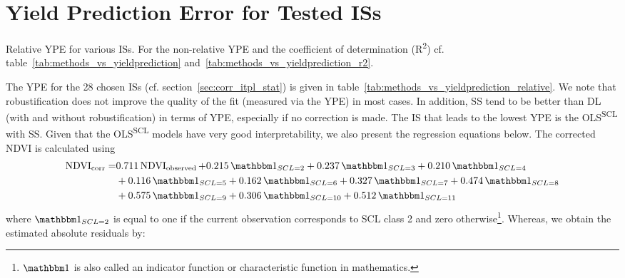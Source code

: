 \section{Yield Prediction Error for Tested ISs} \label{sec:results_ndvi_corr}
	\begin{table}
		\begin{center}
			\caption[Relative Yield Estimation Error for ISs]{Relative YPE for various ISs. For the non-relative YPE and the coefficient of determination (R\textsuperscript{2}) cf. table~\ref{tab:methods_vs_yieldprediction} and~\ref{tab:methods_vs_yieldprediction_r2}.}
			\small
			
			\label{tab:methods_vs_yieldprediction_relative}
			\normalsize
		\end{center}
	\end{table}
	The YPE for the 28 chosen {{IS}}s (cf. section~\ref{sec:corr_itpl_stat}) is given in table~\ref{tab:methods_vs_yieldprediction_relative}. We note that robustification does not improve the quality of the fit (measured via the YPE) in most cases. 
	In addition, SS tend to be better than DL (with and without robustification) in terms of YPE, especially if no correction is made. The {{IS}} that leads to the lowest YPE is the OLS\textsuperscript{SCL} with SS. Given that the OLS\textsuperscript{SCL} models have very good interpretability, we also present the regression equations below. The corrected NDVI is calculated using 
	\begin{equation}\label{eq:corr_lm}
		\begin{aligned}		
			{\operatorname{NDVI}}_{\text{corr}}  = &
			0.711 \operatorname{NDVI}_\text{observed}  
			+ 0.215 \,\mathbbm 1_{{SCL = 2}} 
			+ 0.237 \,\mathbbm 1_{{SCL = 3}} 
			+ 0.210 \,\mathbbm 1_{{SCL = 4}} \\ &
			+ 0.116 \,\mathbbm 1_{{SCL = 5}} 
			+ 0.162 \,\mathbbm 1_{{SCL = 6}} 
			+ 0.327 \,\mathbbm 1_{{SCL = 7}} 
			+ 0.474 \,\mathbbm 1_{{SCL = 8}} \\ &
			+ 0.575 \,\mathbbm 1_{{SCL = 9}} 
			+ 0.306 \,\mathbbm 1_{{SCL = 10}} 
			+ 0.512 \,\mathbbm 1_{{SCL = 11}} 
		\end{aligned}
	\end{equation} 
	where $\mathbbm 1_{{SCL = 2}}$ is equal to one if the current observation corresponds to SCL class 2 and zero otherwise\footnote{$\mathbbm 1$ is also called an indicator function or characteristic function in mathematics.}. Whereas, we obtain the estimated absolute residuals by: 
